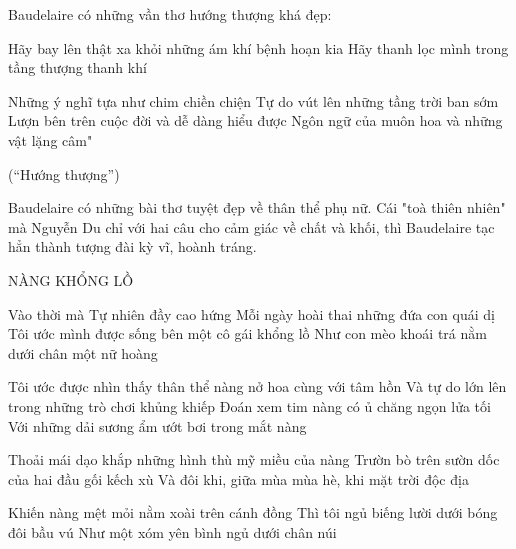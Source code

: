 \documentclass[../main.tex]{subfiles}
\begin{document}
\begin{multicols}{2}
Baudelaire có những vần thơ hướng thượng khá đẹp: 
\begin{blockquote}
        
Hãy bay lên thật xa khỏi những ám khí bệnh hoạn kia        
Hãy thanh lọc mình trong tầng thượng thanh khí 
        
Những ý nghĩ tựa như chim chiền chiện        
Tự do vút lên những tầng trời ban sớm        
Lượn bên trên cuộc đời và dễ dàng hiểu được        
Ngôn ngữ của muôn hoa và những vật lặng câm"         
        
(“Hướng thượng”) 

\end{blockquote}
 
Baudelaire có những bài thơ tuyệt đẹp về thân thể phụ nữ. Cái "toà thiên nhiên" mà Nguyễn Du chỉ với hai câu cho cảm giác về chất và khối, thì Baudelaire tạc hẳn thành tượng đài kỳ vĩ, hoành tráng. 
\begin{blockquote}
        
NÀNG KHỔNG LỒ 
        
Vào thời mà Tự nhiên đầy cao hứng        
Mỗi ngày hoài thai những đứa con quái dị        
Tôi ước mình được sống bên một cô gái khổng lồ        
Như con mèo khoái trá nằm dưới chân một nữ hoàng 
        
Tôi ước được nhìn thấy thân thể nàng nở hoa cùng với tâm hồn        
Và tự do lớn lên trong những trò chơi khủng khiếp        
Đoán xem tim nàng có ủ chăng ngọn lửa tối        
Với những dải sương ẩm ướt bơi trong mắt nàng 
        
Thoải mái dạo khắp những hình thù mỹ miều của nàng        
Trườn bò trên sườn dốc của hai đầu gối kếch xù        
Và đôi khi, giữa mùa mùa hè, khi mặt trời độc địa 
        
Khiến nàng mệt mỏi nằm xoài trên cánh đồng        
Thì tôi ngủ biếng lười dưới bóng đôi bầu vú        
Như một xóm yên bình ngủ dưới chân núi 

\end{blockquote}
 

\end{multicols}
\end{document}
